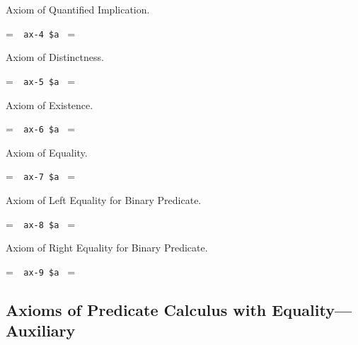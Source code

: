 \noindent Axiom of Quantified Implication.

\setbox\startprefix=\hbox{\tt \ \ ax-4\ \$a\ }
\setbox\contprefix=\hbox{\tt \ \ \ \ \ \ \ \ \ \ }
\startm
\m{\vdash}\m{(}\m{\forall}\m{(}\m{\forall}\m{\varphi}\m{\rightarrow}\m{
\psi}\m{)}\m{\rightarrow}\m{(}\m{\forall}\m{\varphi}\m{\rightarrow}\m{
\forall}\m{\psi}\m{)}\m{)}
\endm

\noindent Axiom of Distinctness.

\setbox\startprefix=\hbox{\tt \ \ ax-5\ \$a\ }
\setbox\contprefix=\hbox{\tt \ \ \ \ \ \ \ \ \ \ }
\startm
\m{\vdash}\m{(}\m{\varphi}\m{\rightarrow}\m{\forall}\m{\varphi}\m{)}\m{ }\m{ }\m{ }\m{\varphi}\m{ }\m{(}\m{ }\m{ }\m{ }\m{ }\m{ }\m{\varphi}\m{)}
\endm

\noindent Axiom of Existence.

\setbox\startprefix=\hbox{\tt \ \ ax-6\ \$a\ }
\setbox\contprefix=\hbox{\tt \ \ \ \ \ \ \ \ \ \ }
\startm
\m{\vdash}\m{(}\m{\forall}\m{(}\m{=}\m{\rightarrow}\m{\forall}
\m{\varphi}\m{)}\m{\rightarrow}\m{\varphi}\m{)}
\endm

\noindent Axiom of Equality.

\setbox\startprefix=\hbox{\tt \ \ ax-7\ \$a\ }
\setbox\contprefix=\hbox{\tt \ \ \ \ \ \ \ \ \ \ }
\startm
\m{\vdash}\m{(}\m{=}\m{\rightarrow}\m{(}\m{=}\m{
\rightarrow}\m{=}\m{)}\m{)}
\endm

\noindent Axiom of Left Equality for Binary Predicate.

\setbox\startprefix=\hbox{\tt \ \ ax-8\ \$a\ }
\setbox\contprefix=\hbox{\tt \ \ \ \ \ \ \ \ \ \ \ }
\startm
\m{\vdash}\m{(}\m{=}\m{\rightarrow}\m{(}\m{\in}\m{
\rightarrow}\m{\in}\m{)}\m{)}
\endm

\noindent Axiom of Right Equality for Binary Predicate.

\setbox\startprefix=\hbox{\tt \ \ ax-9\ \$a\ }
\setbox\contprefix=\hbox{\tt \ \ \ \ \ \ \ \ \ \ \ }
\startm
\m{\vdash}\m{(}\m{=}\m{\rightarrow}\m{(}\m{\in}\m{
\rightarrow}\m{\in}\m{)}\m{)}
\endm


\subsection{Axioms of Predicate Calculus with Equality---Auxiliary}

